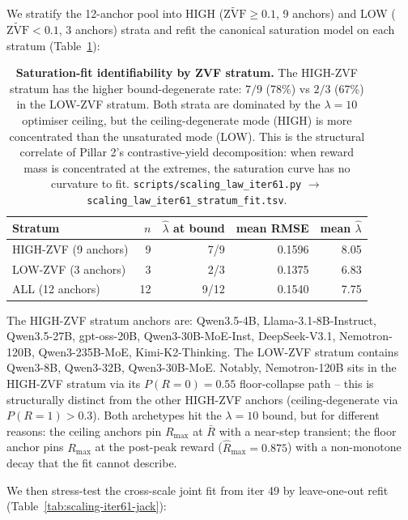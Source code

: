 \documentclass{article}
\providecommand{\tableref}[1]{Table~\ref{#1}}
\begin{document}
We stratify the 12-anchor pool into HIGH (\(\widetilde{\mathrm{ZVF}} \geq 0.1\),
9 anchors) and LOW (\(\widetilde{\mathrm{ZVF}} < 0.1\),
3 anchors) strata and refit the canonical
saturation model on each stratum
(\tableref{tab:scaling-iter61-stratum}):

\begin{table}[t]
  \centering
  \small
  \begin{tabular}{lrrrr}
    \toprule
    Stratum & \(n\) & \(\hat\lambda\) at bound & mean RMSE & mean \(\hat\lambda\) \\
    \midrule
    HIGH-ZVF (9 anchors)  & 9 & 7/9 & 0.1596 & 8.05 \\
    LOW-ZVF (3 anchors)  & 3 & 2/3 & 0.1375 & 6.83 \\
    ALL (12 anchors)                       & 12 & 9/12 & 0.1540 & 7.75 \\
    \bottomrule
  \end{tabular}
  \caption{\textbf{Saturation-fit identifiability by ZVF stratum.}
    The HIGH-ZVF stratum has the higher bound-degenerate rate:
    \(7/9\)
    (78\%) vs
    \(2/3\)
    (67\%) in the LOW-ZVF
    stratum.  Both strata are dominated by the
    \(\lambda = 10\) optimiser ceiling, but the
    ceiling-degenerate mode (HIGH) is more concentrated than the
    unsaturated mode (LOW).  This is the structural correlate of
    Pillar 2's contrastive-yield decomposition: when reward mass is
    concentrated at the extremes, the saturation curve has no
    curvature to fit.  \texttt{scripts/scaling\_law\_iter61.py}
    \(\to\) \texttt{scaling\_law\_iter61\_stratum\_fit.tsv}.}
  \label{tab:scaling-iter61-stratum}
\end{table}

The HIGH-ZVF stratum anchors are: Qwen3.5-4B, Llama-3.1-8B-Instruct, Qwen3.5-27B, gpt-oss-20B, Qwen3-30B-MoE-Inst, DeepSeek-V3.1, Nemotron-120B, Qwen3-235B-MoE, Kimi-K2-Thinking.  The LOW-ZVF
stratum contains Qwen3-8B, Qwen3-32B, Qwen3-30B-MoE.  Notably, Nemotron-120B sits in the
HIGH-ZVF stratum via its \(P(R=0) = 0.55\) floor-collapse path --
this is structurally distinct from the other HIGH-ZVF anchors
(ceiling-degenerate via \(P(R=1) > 0.3\)).  Both archetypes hit
the \(\lambda = 10\) bound, but for different reasons: the
ceiling anchors pin \(R_{\max}\) at \(\bar R\) with a
near-step transient; the floor anchor pins \(R_{\max}\) at the
post-peak reward (\(\hat R_{\max} = 0.875\)) with a
non-monotone decay that the fit cannot describe.

We then stress-test the cross-scale joint fit from iter 49 by
leave-one-out refit (\tableref{tab:scaling-iter61-jack}):
\end{document}
